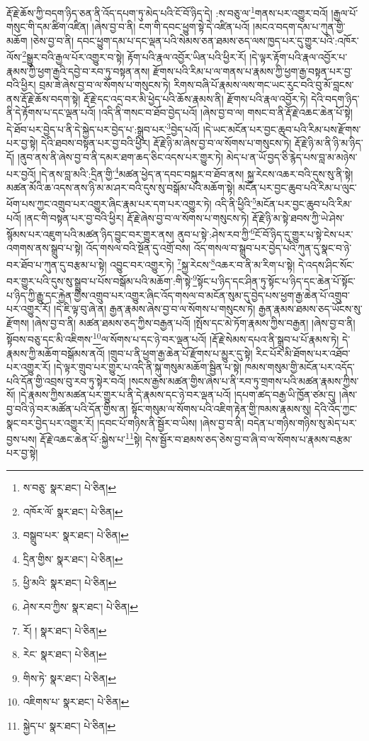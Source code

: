 རྡོ་རྗེ་ཆོས་ཀྱི་བདག་ཉིད་ཅན་ནི་འོད་དཔག་ཏུ་མེད་པའི་ངོ་བོ་ཉིད་དེ། :ས་བཅུ་ལ་\footnote{ས་བཅུ་  སྣར་ཐང་།  པེ་ཅིན། }གནས་པར་འགྱུར་བའོ། །རྒྱལ་པོ་གསུང་གི་དམ་ཚིག་འཛིན། །ཞེས་བྱ་བ་ནི། ངག་གི་དབང་ཕྱུག་སྟེ་དེ་འཛིན་པའོ། །མངའ་བདག་དམ་པ་ཀུན་གྱི་མཆོག །ཅེས་བྱ་བ་ནི། དབང་ཕྱུག་དམ་པ་དང་ལྡན་པའི་སེམས་ཅན་ཐམས་ཅད་ལས་ཁྱད་པར་དུ་གྱུར་པའི་:འཁོར་ལོས་\footnote{འཁོར་ལོ་  སྣར་ཐང་།  པེ་ཅིན། }སྒྱུར་བའི་རྒྱལ་པོར་འགྱུར་བ་སྟེ། རྟོག་པའི་རྣལ་འབྱོར་ཡིན་པའི་ཕྱིར་རོ། །དེ་ལྟར་རྟོག་པའི་རྣལ་འབྱོར་པ་རྣམས་ཀྱི་ཕྱག་རྒྱའི་དབྱེ་བ་རབ་ཏུ་བསྟན་ནས། རྫོགས་པའི་རིམ་པ་ལ་གནས་པ་རྣམས་ཀྱི་ཕྱག་རྒྱ་བསྟན་པར་བྱ་བའི་ཕྱིར། བྲམ་ཟེ་ཞེས་བྱ་བ་ལ་སོགས་པ་གསུངས་ཏེ། རིགས་བཞི་པོ་རྣམས་ལས་གང་ཡང་རུང་བའི་བུ་མོ་བླངས་ནས་རྡོ་རྗེ་ཆོས་བདག་སྟེ། རྡོ་རྗེ་དང་འདྲ་བར་མི་ཕྱེད་པའི་ཆོས་རྣམས་ནི། རྫོགས་པའི་རྣལ་འབྱོར་ཏེ། དེའི་བདག་ཉིད་ནི་དེ་རྟོགས་པ་དང་ལྡན་པའོ། །འདི་ནི་གསང་བ་ཐོབ་བྱེད་པའོ། །ཞེས་བྱ་བ་ལ། གསང་བ་ནི་རྡོ་རྗེ་འཆང་ཆེན་པོ་སྟེ། དེ་ཐོབ་པར་བྱེད་པ་ནི་དེ་སྐྱེད་པར་བྱེད་པ་:སྒྲུབ་པར་\footnote{བསྒྲུབ་པར་  སྣར་ཐང་།  པེ་ཅིན། }བྱེད་པའོ། །དེ་ཡང་མངོན་པར་བྱང་ཆུབ་པའི་རིམ་པས་རྫོགས་པར་བྱ་སྟེ། དེའི་ཐབས་བསྟན་པར་བྱ་བའི་ཕྱིར། རྡོ་རྗེ་ཉི་མ་ཞེས་བྱ་བ་ལ་སོགས་པ་གསུངས་ཏེ། རྡོ་རྗེ་ཉི་མ་ནི་ཉི་མ་ཉིད་དོ། །ནུབ་ནས་ནི་ཞེས་བྱ་བ་ནི་དམར་ཐག་ཆད་ཅིང་འདས་པར་གྱུར་ཏེ། མེད་པ་ན་ཡོ་བྱད་ཅི་རྙེད་པས་བླ་མ་མཉེས་པར་བྱའོ། །དེ་ནས་བླ་མའི་:དྲིན་གྱི་\footnote{དྲིན་གྱིས་  སྣར་ཐང་།  པེ་ཅིན། }མཚན་ཕྱེད་ན་དབང་བསྐུར་བ་ཐོབ་ནས། སྐྱ་རེངས་འཆར་བའི་དུས་སུ་ནི་སྟེ། མཚན་མོའི་ཆ་འདས་ནས་ཉི་མ་མ་ཤར་བའི་དུས་སུ་བསྒོམ་པའི་མཆོག་སྟེ། མངོན་པར་བྱང་ཆུབ་པའི་རིམ་པ་ལུང་ཕོག་པས་ཀྱང་འགྲུབ་པར་འགྱུར་ཞིང་རྣམ་པར་དག་པར་འགྱུར་ཏེ། འདི་ནི་ཕྱིའི་\footnote{ཕྱི་མའི་  སྣར་ཐང་།  པེ་ཅིན། }མངོན་པར་བྱང་ཆུབ་པའི་རིམ་པའོ། །ནང་གི་བསྟན་པར་བྱ་བའི་ཕྱིར། རྡོ་རྗེ་ཞེས་བྱ་བ་ལ་སོགས་པ་གསུངས་ཏེ། རྡོ་རྗེ་ཉི་མ་སྟེ་ཐབས་ཀྱི་ཡེ་ཤེས་སྙོམས་པར་འཇུག་པའི་མཚན་ཉིད་བྱུང་བར་གྱུར་ནས། ནུབ་པ་སྟེ་:ཤེས་རབ་ཀྱི་\footnote{ཤེས་རབ་ཀྱིས་  སྣར་ཐང་།  པེ་ཅིན། }ངོ་བོ་ཉིད་དུ་གྱུར་པ་སྟེ་ངེས་པར་འགགས་ནས་སྒྲུབ་པ་སྟེ། འོད་གསལ་བའི་སྔོན་དུ་འགྲོ་བས། འོད་གསལ་བ་སྒྲུབ་པར་བྱེད་པའི་ཀུན་དུ་སྣང་བ་ཉེ་བར་ཐོབ་པ་ཀུན་དུ་བརྩམ་པ་སྟེ། འབྱུང་བར་འགྱུར་ཏེ། \footnote{རོ། །  སྣར་ཐང་།  པེ་ཅིན། }སྐྱ་རེངས་\footnote{རེང་  སྣར་ཐང་།  པེ་ཅིན། }འཆར་བ་ནི་མ་རིག་པ་སྟེ། དེ་འདས་ཤིང་སོང་བར་གྱུར་པའི་དུས་སུ་སྒྲུབ་པ་པོས་བསྒོམ་པའི་མཆོག་:གི་སྟེ་\footnote{གིས་ཏེ་  སྣར་ཐང་།  པེ་ཅིན། }སྟོང་པ་ཉིད་དང་ཤིན་ཏུ་སྟོང་པ་ཉིད་དང་ཆེན་པོ་སྟོང་པ་ཉིད་ཀྱི་རྒྱུ་དང་རྐྱེན་གྱིས་འགྲུབ་པར་འགྱུར་ཞིང་འོད་གསལ་བ་མངོན་སུམ་དུ་བྱེད་པས་ཕྱག་རྒྱ་ཆེན་པོ་འགྲུབ་པར་འགྱུར་རོ། །དེ་ཇི་ལྟ་བུ་ཞེ་ན། རྒྱན་རྣམས་ཞེས་བྱ་བ་ལ་སོགས་པ་གསུངས་ཏེ། རྒྱན་རྣམས་ཐམས་ཅད་ཡོངས་སུ་རྫོགས། །ཞེས་བྱ་བ་ནི། མཚན་ཐམས་ཅད་ཀྱིས་བརྒྱན་པའོ། །སྤོས་དང་མེ་ཏོག་རྣམས་ཀྱིས་བརྒྱན། །ཞེས་བྱ་བ་ནི། སྟོབས་བཅུ་དང་མི་འཇིགས་\footnote{འཇིགས་པ་  སྣར་ཐང་།  པེ་ཅིན། }ལ་སོགས་པ་དང་ཉེ་བར་ལྡན་པའོ། །རྡོ་རྗེ་སེམས་དཔའ་ནི་སྒྲུབ་པ་པོ་རྣམས་ཏེ། དེ་རྣམས་ཀྱི་མཆོག་བསྒོམས་ནའོ། །གྲུབ་པ་ནི་ཕྱག་རྒྱ་ཆེན་པོ་རྫོགས་པ་མྱུར་དུ་སྟེ། རིང་པོར་མི་ཐོགས་པར་འཐོབ་པར་འགྱུར་རོ། །དེ་ལྟར་གྲུབ་པར་གྱུར་པ་འདི་ནི་སྐུ་གསུམ་མཆོག་སྦྱིན་པ་སྟེ། ཁམས་གསུམ་གྱི་མངོན་པར་འདོད་པའི་དོན་གྱི་འབྲས་བུ་རབ་ཏུ་སྟེར་བའོ། །སངས་རྒྱས་མཚན་གྱིས་ཞེས་པ་ནི་རབ་ཏུ་གྲགས་པའི་མཚན་རྣམས་ཀྱིས་སོ། །དེ་རྣམས་ཀྱིས་མཚན་པར་གྱུར་པ་ནི་དེ་རྣམས་དང་ཉེ་བར་ལྡན་པའོ། །དཔག་ཚད་བརྒྱ་ཡི་ཁྱོན་ཙམ་དུ། །ཞེས་བྱ་བའི་ཉེ་བར་མཚོན་པའི་དོན་གྱིས་ན། སྟོང་གསུམ་ལ་སོགས་པའི་འཇིག་རྟེན་གྱི་ཁམས་རྣམས་སུ། དེའི་འོད་ཀྱང་སྣང་བར་བྱེད་པར་འགྱུར་རོ། །དབང་པོ་གཉིས་ནི་སྦྱོར་བ་ཡིས། །ཞེས་བྱ་བ་ནི། བདེན་པ་གཉིས་གཉིས་སུ་མེད་པར་བྱས་པས། རྡོ་རྗེ་འཆང་ཆེན་པོ་:སྐྱེས་པ་\footnote{སྐྱེད་པ་  སྣར་ཐང་།  པེ་ཅིན། }སྟེ། དེས་སྦྱོར་བ་ཐམས་ཅད་ཅེས་བྱ་བ་ཞི་བ་ལ་སོགས་པ་རྣམས་བརྩམ་པར་བྱ་སྟེ། 